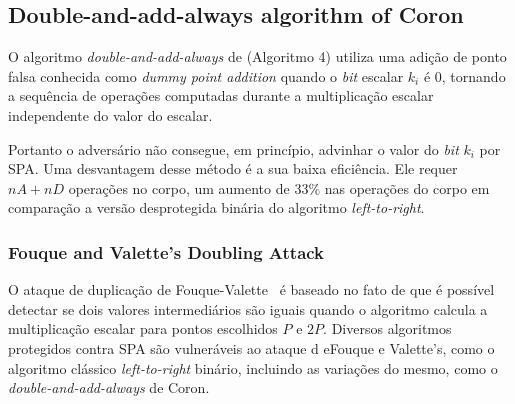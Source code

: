 
\subsection{Double-and-add-always algorithm of Coron~\cite{Coron1999}}

O algoritmo {\it double-and-add-always} de \cite{Coron1999} (Algoritmo 4) utiliza uma adição de ponto falsa conhecida como \textit{dummy point addition} quando o \textit{bit} escalar $k_i$ é $0$, tornando a sequência de operações computadas durante a multiplicação escalar independente do valor do escalar.

Portanto o adversário não consegue, em princípio, advinhar o valor do \textit{bit} $k_i$ por SPA. Uma desvantagem desse método é a sua baixa eficiência. Ele requer $nA + nD$ operações no corpo, um aumento de $33\%$ nas operações do corpo em comparação a versão desprotegida binária do algoritmo \textit{left-to-right}.

\subsubsection{Fouque and Valette's Doubling Attack \cite{CHES:FouVal03}}\label{Fouque-Valette-DoublingAttack}
O ataque de duplicação de Fouque-Valette~\cite{CHES:FouVal03} é baseado no fato de que é possível detectar se dois valores intermediários são iguais quando o algoritmo calcula a multiplicação escalar para pontos escolhidos $P$ e $2P$. Diversos algoritmos protegidos contra SPA são vulneráveis ao ataque d eFouque e Valette's, como o algoritmo clássico \textit{left-to-right} binário, incluindo as variações do mesmo, como o \textit{double-and-add-always} de Coron.

